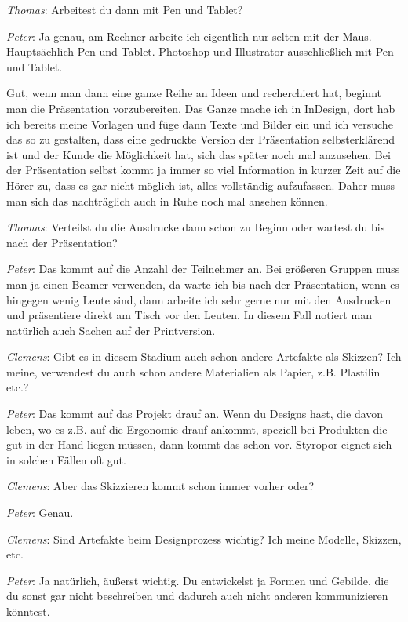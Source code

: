 \medskip \emph{Thomas}: Arbeitest du dann mit Pen und Tablet?

\medskip \emph{Peter}: Ja genau, am Rechner arbeite ich eigentlich nur selten mit der Maus. Hauptsächlich Pen und Tablet. Photoshop und Illustrator ausschließlich mit Pen und Tablet.

Gut, wenn man dann eine ganze Reihe an Ideen und recherchiert hat, beginnt man die Präsentation vorzubereiten. Das Ganze mache ich in InDesign, dort hab ich bereits meine Vorlagen und füge dann Texte und Bilder ein und ich versuche das so zu gestalten, dass eine gedruckte Version der Präsentation selbsterklärend ist und der Kunde die Möglichkeit hat, sich das später noch mal anzusehen. Bei der Präsentation selbst kommt ja immer so viel Information in kurzer Zeit auf die Hörer zu, dass es gar nicht möglich ist, alles vollständig aufzufassen. Daher muss man sich das nachträglich auch in Ruhe noch mal ansehen können.

\medskip \emph{Thomas}: Verteilst du die Ausdrucke dann schon zu Beginn oder wartest du bis nach der Präsentation?

\medskip \emph{Peter}: Das kommt auf die Anzahl der Teilnehmer an. Bei größeren Gruppen muss man ja einen Beamer verwenden, da warte ich bis nach der Präsentation, wenn es hingegen wenig Leute sind, dann arbeite ich sehr gerne nur mit den Ausdrucken und präsentiere direkt am Tisch vor den Leuten. In diesem Fall notiert man natürlich auch Sachen auf der Printversion. 

\medskip \emph{Clemens}: Gibt es in diesem Stadium auch schon andere Artefakte als Skizzen? Ich meine, verwendest du auch schon andere Materialien als Papier, z.B. Plastilin etc.?

\medskip \emph{Peter}: Das kommt auf das Projekt drauf an. Wenn du Designs hast, die davon leben, wo es z.B. auf die Ergonomie drauf ankommt, speziell bei Produkten die gut in der Hand liegen müssen, dann kommt das schon vor. Styropor eignet sich in solchen Fällen oft gut.

\medskip \emph{Clemens}: Aber das Skizzieren kommt schon immer vorher oder?

\medskip \emph{Peter}: Genau.

\medskip \emph{Clemens}: Sind Artefakte beim Designprozess wichtig? Ich meine Modelle, Skizzen, etc.

\medskip \emph{Peter}: Ja natürlich, äußerst wichtig. Du entwickelst ja Formen und Gebilde, die du sonst gar nicht beschreiben und dadurch auch nicht anderen kommunizieren könntest.

